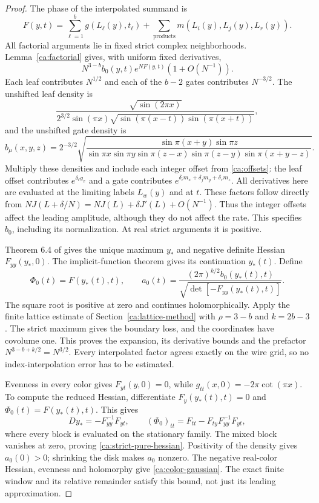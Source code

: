 \begin{proof}
The phase of the interpolated summand is
\[
 F(y,t)=\sum_{\ell=1}^b g(L_\ell(y),t_\ell)
            +\sum_{\text{products}}m(L_i(y),L_j(y),L_r(y)).
\]
All factorial arguments lie in fixed strict complex neighborhoods.
Lemma~\ref{ca:factorial} gives, with uniform fixed derivatives,
\[
 N^{3-b}b_0(y,t)e^{NF(y,t)}(1+O(N^{-1})).
\]
Each leaf contributes $N^{1/2}$ and each of the $b-2$ gates
contributes $N^{-3/2}$. The unshifted leaf density is
\[
 \frac{\sqrt{\sin(2\pi x)}}
 {2^{3/2}\sin(\pi x)
       \sqrt{\sin(\pi(x-t))\sin(\pi(x+t))}},
\]
and the unshifted gate density is
\[
 b_\mu(x,y,z)=2^{-3/2}
 \sqrt{\frac{\sin\pi(x+y)\sin\pi z}
 {\sin\pi x\sin\pi y\sin\pi(z-x)\sin\pi(z-y)\sin\pi(x+y-z)}}.
\]
Multiply these densities and include each integer offset from
\eqref{ca:offsets}: the leaf offset contributes
$e^{\delta_\ell g_x}$ and a gate contributes
$e^{\delta_i m_x+\delta_jm_y+\delta_rm_z}$.
All derivatives here are evaluated at the limiting labels
$L_w(y)$ and at $t$. These factors follow directly from
$NJ(L+\delta/N)=NJ(L)+\delta J'(L)+O(N^{-1})$.
Thus the integer offsets affect the leading amplitude, although they
do not affect the rate. This specifies $b_0$, including its
normalization. At real strict
arguments it is positive.

Theorem 6.4 of \cite{Newton} gives the unique maximum $y_*$ and
negative definite Hessian $F_{yy}(y_*,0)$.
The implicit-function theorem gives its continuation $y_*(t)$.
Define
\[
 \Phi_0(t)=F(y_*(t),t),\qquad
 a_0(t)=
 \frac{(2\pi)^{k/2}b_0(y_*(t),t)}
 {\sqrt{\det[-F_{yy}(y_*(t),t)]}}.
\]
The square root is positive at zero and continues holomorphically.
Apply the finite lattice estimate of Section~\ref{ca:lattice-method}
with $\rho=3-b$ and $k=2b-3$.
The strict maximum gives the boundary loss, and the coordinates
have covolume one. This proves the expansion, its derivative bounds
and the prefactor $N^{3-b+k/2}=N^{3/2}$.
Every interpolated factor agrees exactly on the wire grid, so no
index-interpolation error has to be estimated.

Evenness in every color gives $F_{yt}(y,0)=0$, while
$g_{tt}(x,0)=-2\pi\cot(\pi x)$.
To compute the reduced Hessian, differentiate
$F_y(y_*(t),t)=0$ and $\Phi_0(t)=F(y_*(t),t)$. This gives
\begin{equation}\label{ca:stationary-schur}
 Dy_*=-F_{yy}^{-1}F_{yt},\qquad
 (\Phi_0)_{tt}=F_{tt}-F_{ty}F_{yy}^{-1}F_{yt},
\end{equation}
where every block is evaluated on the stationary family. The mixed
block vanishes at zero, proving \eqref{ca:strict-pure-hessian}.
Positivity of the density gives
$a_0(0)>0$; shrinking the disk makes $a_0$ nonzero.
The negative real-color Hessian, evenness and holomorphy give
\eqref{ca:color-gaussian}. The exact finite window and its relative
remainder satisfy this bound, not just its leading approximation.


\end{proof}
